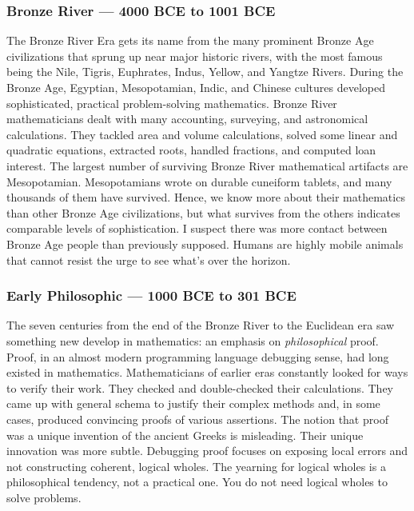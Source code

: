 \subsubsection*{Bronze River --- 4000 BCE to 1001 BCE}%

The Bronze River Era gets its name from the many prominent Bronze Age
civilizations that sprung up near major historic rivers, with the most
famous being the Nile, Tigris, Euphrates, Indus, Yellow, and Yangtze
Rivers. During the Bronze Age, Egyptian, Mesopotamian, Indic, and
Chinese cultures developed sophisticated, practical problem-solving
mathematics. Bronze River mathematicians dealt with many accounting,
surveying, and astronomical calculations. They tackled area and volume
calculations, solved some linear and quadratic equations, extracted
roots, handled fractions, and computed loan interest. The largest number
of surviving Bronze River mathematical artifacts are Mesopotamian.
Mesopotamians wrote on durable cuneiform tablets, and many thousands of
them have survived. Hence, we know more about their mathematics than
other Bronze Age civilizations, but what survives from the others
indicates comparable levels of sophistication. I suspect there was more
contact between Bronze Age people than previously supposed. Humans are
highly mobile animals that cannot resist the urge to see what's over the
horizon.

\subsubsection*{Early Philosophic --- 1000 BCE to 301 BCE}%

The seven centuries from the end of the Bronze River to the Euclidean
era saw something new develop in mathematics: an emphasis on
\emph{philosophical} proof. Proof, in an almost modern programming
language debugging sense, had long existed in mathematics.
Mathematicians of earlier eras constantly looked for ways to verify
their work. They checked and double-checked their calculations. They
came up with general schema to justify their complex methods and, in
some cases, produced convincing proofs of various assertions. The notion
that proof was a unique invention of the ancient Greeks is misleading.
Their unique innovation was more subtle. Debugging proof focuses on
exposing local errors and not constructing coherent, logical wholes. The
yearning for logical wholes is a philosophical tendency, not a practical
one. You do not need logical wholes to solve problems.

